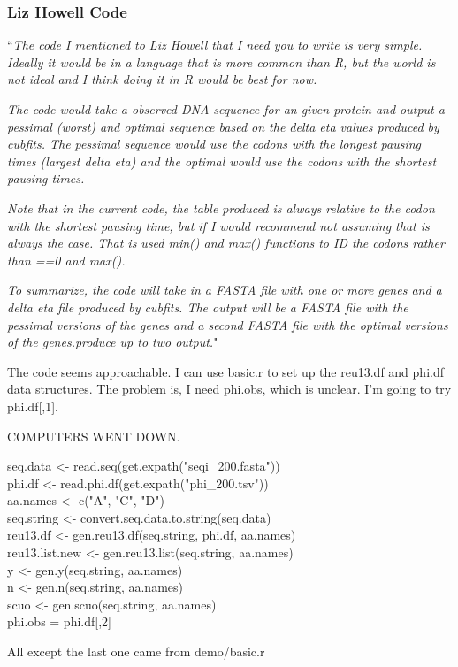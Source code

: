 \documentclass[11pt]{article} %
\begin{document}
\subsubsection{Liz Howell Code}
``\textit{The code I mentioned to Liz Howell that I need you to write is very simple. Ideally it would be in a language that is more common than R, but the world is not ideal and I think doing it in R would be best for now.}

\textit{The code would take a observed DNA sequence for an given protein and output a pessimal (worst) and optimal sequence based on the delta eta values produced by cubfits.  The pessimal sequence would use the codons with the longest pausing times (largest delta eta) and the optimal would use the codons with the shortest pausing times.}

\textit{Note that in the current code, the table produced is always relative to the codon with the shortest pausing time, but if I would recommend not assuming that is always the case.  That is used min() and max() functions to ID the codons rather than ==0 and max().}

\textit{To summarize, the code will take in a FASTA file with one or more genes and a delta eta file produced by cubfits.  The output will be a FASTA file with the pessimal versions of the genes and a second FASTA file with the optimal versions of the genes.produce up to two output.}"


The code seems approachable. I can use basic.r to set up the reu13.df and phi.df data structures. The problem is, I need phi.obs, which is unclear. I'm going to try phi.df[,1].

COMPUTERS WENT DOWN.

seq.data <- read.seq(get.expath("seqi\_200.fasta"))\\
phi.df <- read.phi.df(get.expath("phi\_200.tsv"))\\
aa.names <- c("A", "C", "D")\\
seq.string <- convert.seq.data.to.string(seq.data)\\
reu13.df <- gen.reu13.df(seq.string, phi.df, aa.names)\\
reu13.list.new <- gen.reu13.list(seq.string, aa.names)\\
y <- gen.y(seq.string, aa.names)\\
n <- gen.n(seq.string, aa.names)\\
scuo <- gen.scuo(seq.string, aa.names) \\
phi.obs = phi.df[,2]

All except the last one came from demo/basic.r
\end{document}
